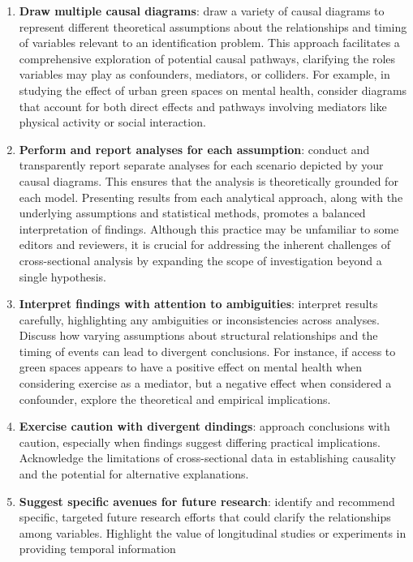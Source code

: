 \documentclass[
  singlecolumn]{article}
\begin{document}
\begin{enumerate}
\def\labelenumi{\arabic{enumi}.}
\item
  \textbf{Draw multiple causal diagrams}: draw a variety of causal
  diagrams to represent different theoretical assumptions about the
  relationships and timing of variables relevant to an identification
  problem. This approach facilitates a comprehensive exploration of
  potential causal pathways, clarifying the roles variables may play as
  confounders, mediators, or colliders. For example, in studying the
  effect of urban green spaces on mental health, consider diagrams that
  account for both direct effects and pathways involving mediators like
  physical activity or social interaction.
\item
  \textbf{Perform and report analyses for each assumption}: conduct and
  transparently report separate analyses for each scenario depicted by
  your causal diagrams. This ensures that the analysis is theoretically
  grounded for each model. Presenting results from each analytical
  approach, along with the underlying assumptions and statistical
  methods, promotes a balanced interpretation of findings. Although this
  practice may be unfamiliar to some editors and reviewers, it is
  crucial for addressing the inherent challenges of cross-sectional
  analysis by expanding the scope of investigation beyond a single
  hypothesis.
\item
  \textbf{Interpret findings with attention to ambiguities}: interpret
  results carefully, highlighting any ambiguities or inconsistencies
  across analyses. Discuss how varying assumptions about structural
  relationships and the timing of events can lead to divergent
  conclusions. For instance, if access to green spaces appears to have a
  positive effect on mental health when considering exercise as a
  mediator, but a negative effect when considered a confounder, explore
  the theoretical and empirical implications.
\item
  \textbf{Exercise caution with divergent dindings}: approach
  conclusions with caution, especially when findings suggest differing
  practical implications. Acknowledge the limitations of cross-sectional
  data in establishing causality and the potential for alternative
  explanations.
\item
  \textbf{Suggest specific avenues for future research}: identify and
  recommend specific, targeted future research efforts that could
  clarify the relationships among variables. Highlight the value of
  longitudinal studies or experiments in providing temporal information

\end{enumerate}
\end{document}
